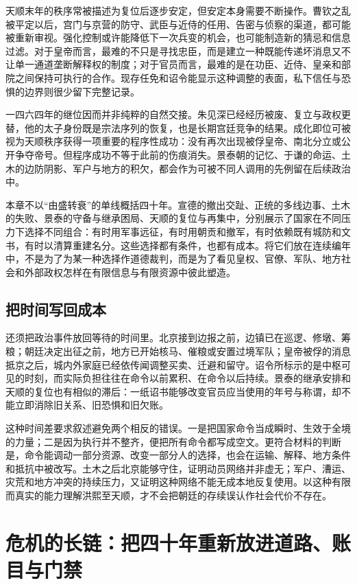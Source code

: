 天顺末年的秩序常被描述为复位后逐步安定，但安定本身需要不断操作。曹钦之乱被平定以后，宫门与京营的防守、武臣与近侍的任用、告密与侦察的渠道，都可能被重新审视。强化控制或许能降低下一次兵变的机会，也可能制造新的猜忌和信息过滤。对于皇帝而言，最难的不只是寻找忠臣，而是建立一种既能传递坏消息又不让单一通道垄断解释权的制度；对于官员而言，最难的是在功臣、近侍、皇亲和部院之间保持可执行的合作。现存任免和诏令能显示这种调整的表面，私下信任与恐惧的边界则很少留下完整记录。

一四六四年的继位因而并非纯粹的自然交接。朱见深已经经历被废、复立与政权更替，他的太子身份既是宗法序列的恢复，也是长期宫廷竞争的结果。成化即位可被视为天顺秩序获得一项重要的程序性成功：没有再次出现被俘皇帝、南北分立或公开争夺帝号。但程序成功不等于此前的伤痕消失。景泰朝的记忆、于谦的命运、土木的边防阴影、军户与地方的积欠，都会作为可被不同人调用的先例留在后续政治中。

本章不以“由盛转衰”的单线概括四十年。宣德的撤出交趾、正统的多线边事、土木的失败、景泰的守备与继承困局、天顺的复位与再集中，分别展示了国家在不同压力下选择不同组合：有时用军事远征，有时用朝贡和撤军，有时依赖既有城防和文书，有时以清算重建名分。这些选择都有条件，也都有成本。将它们放在连续编年中，不是为了为某一种选择作道德裁判，而是为了看见皇权、官僚、军队、地方社会和外部政权怎样在有限信息与有限资源中彼此塑造。
\subsection{把时间写回成本}

还须把政治事件放回等待的时间里。北京接到边报之前，边镇已在巡逻、修墩、筹粮；朝廷决定出征之前，地方已开始核马、催粮或安置过境军队；皇帝被俘的消息抵京之后，城内外家庭已经依传闻调整买卖、迁避和留守。诏令所标示的是中枢可见的时刻，而实际负担往往在命令以前累积、在命令以后持续。景泰的继承安排和天顺的复位也有相似的滞后：一纸诏书能够改变官员应当使用的年号与称谓，却不能立即消除旧关系、旧恐惧和旧欠账。

这种时间差要求叙述避免两个相反的错误。一是把国家命令当成瞬时、生效于全境的力量；二是因为执行并不整齐，便把所有命令都写成空文。更符合材料的判断是，命令能调动一部分资源、改变一部分人的选择，也会在运输、解释、地方条件和抵抗中被改写。土木之后北京能够守住，证明动员网络并非虚无；军户、漕运、灾荒和地方冲突的持续压力，又证明这种网络不能无成本地反复使用。以这种有限而真实的能力理解洪熙至天顺，才不会把朝廷的存续误认作社会代价不存在。

\section{危机的长链：把四十年重新放进道路、账目与门禁}

